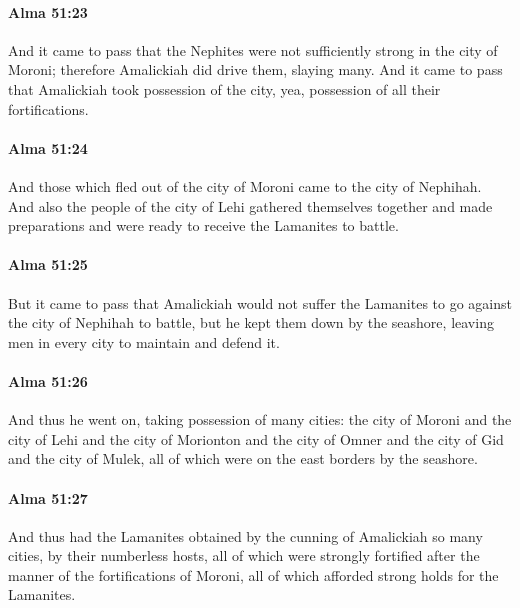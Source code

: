 		\paragraph{Alma 51:23} %
			\label{ALMA-51-23}

			And it came to pass that
			the Nephites were not sufficiently strong in the city of Moroni;
			therefore Amalickiah did drive them, slaying many.
			And it came to pass that Amalickiah took possession of the city,
			yea, possession of all their fortifications.

		\paragraph{Alma 51:24} %
			\label{ALMA-51-24}

			And those which fled out of the city of Moroni came to the city of Nephihah.
			And also the people of the city of Lehi gathered themselves together
			and made preparations and were ready to receive the Lamanites to battle.

		\paragraph{Alma 51:25} %
			\label{ALMA-51-25}

			But it came to pass that Amalickiah would not suffer the Lamanites
			to go against the city of Nephihah to battle,
			but he kept them down by the seashore,
			leaving men in every city to maintain and defend it.

		\paragraph{Alma 51:26} %
			\label{ALMA-51-26}

			And thus he went on, taking possession of many cities:
			the city of Moroni and the city of Lehi and the city of Morionton
			and the city of Omner and the city of Gid and the city of Mulek,
			all of which were on the east borders by the seashore.

		\paragraph{Alma 51:27} %
			\label{ALMA-51-27}

			And thus had the Lamanites obtained by the cunning of Amalickiah
			so many cities, by their numberless hosts,
			all of which were strongly fortified
			after the manner of the fortifications of Moroni,
			all of which afforded strong holds for the Lamanites.

